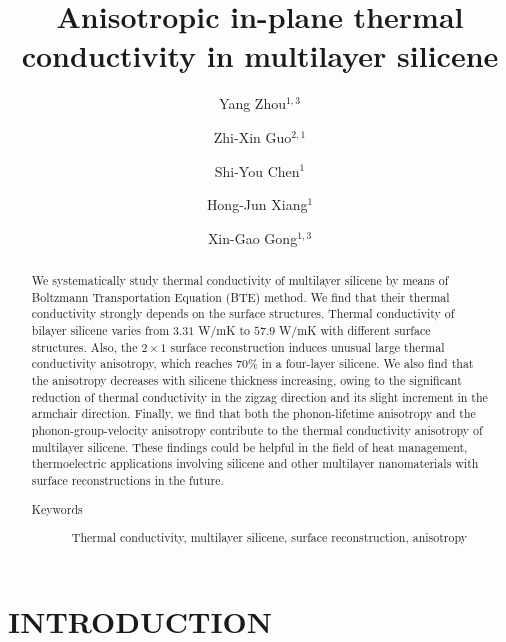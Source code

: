 \documentclass[aps,prb,twocolumn,showpacs,amsmath,amssymb]{revtex4-1}
\begin{document}
\title{Anisotropic in-plane thermal conductivity in multilayer silicene}
\author{Yang Zhou${}^{1,3}$}
\author{Zhi-Xin Guo${}^{2,1}$}
\author{Shi-You Chen${}^{1}$}
\author{Hong-Jun Xiang${}^{1}$}
\author{Xin-Gao Gong${}^{1,3}$}
\begin{abstract}
  We systematically study thermal conductivity of multilayer silicene by means of Boltzmann Transportation Equation (BTE) method.  We find that their thermal conductivity strongly depends on the surface structures. Thermal conductivity of bilayer silicene varies from $3.31$ W/mK to $57.9$ W/mK with different surface structures. Also, the $2\times1$ surface reconstruction induces unusual large thermal conductivity anisotropy, which reaches 70\%  in a four-layer silicene.  We also find that the anisotropy decreases with silicene thickness increasing, owing to the significant reduction of thermal conductivity in the zigzag direction and its slight increment  in the armchair direction.
  Finally, we find that both the phonon-lifetime anisotropy and the phonon-group-velocity  anisotropy contribute to the thermal conductivity anisotropy of multilayer silicene.
  These findings could be helpful in the field of heat management, thermoelectric applications involving silicene and other multilayer nanomaterials  with surface reconstructions in the future.

  \begin{description}
    \item[Keywords]
          Thermal conductivity, multilayer silicene, surface reconstruction, anisotropy
  \end{description}
\end{abstract}

\maketitle

\section{INTRODUCTION}
\end{document}
